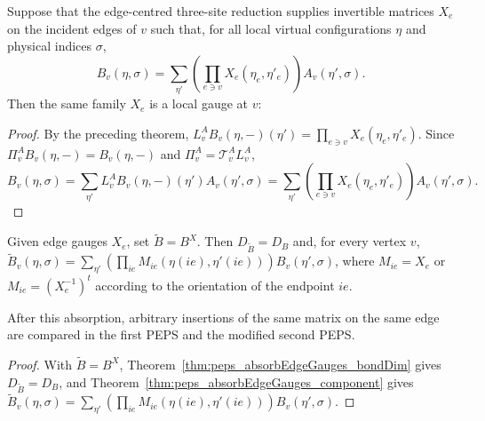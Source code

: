 \begin{theorem}%
    \label{thm:peps_localGauge_exists_of_blockedMiddleGaugeFormula}
    \leanok
    Suppose that the edge-centred three-site reduction supplies invertible
    matrices $X_e$ on the incident edges of $v$ such that, for all local virtual
    configurations $\eta$ and physical indices $\sigma$,
    \[
        B_v(\eta,\sigma)
        =
        \sum_{\eta'}
        \left(\prod_{e\ni v} X_e(\eta_e,\eta'_e)\right)A_v(\eta',\sigma).
    \]
    Then the same family $X_e$ is a local gauge at $v$:
    \begin{center}
        \TNPEPSBlockedMiddleLocalGaugeFormula
    \end{center}
\end{theorem}
\begin{proof}\leanok
    By the preceding theorem,
    $L^A_vB_v(\eta,-)(\eta')=\prod_{e\ni v}X_e(\eta_e,\eta'_e)$. Since
    $\Pi^A_vB_v(\eta,-)=B_v(\eta,-)$ and
    $\Pi^A_v=\mathcal T^A_vL^A_v$,
    \[
        B_v(\eta,\sigma)
        =
        \sum_{\eta'}L^A_vB_v(\eta,-)(\eta')A_v(\eta',\sigma)
        =
        \sum_{\eta'}
        \left(\prod_{e\ni v}X_e(\eta_e,\eta'_e)\right)A_v(\eta',\sigma).
    \]
\end{proof}

\begin{theorem}%
    \label{thm:peps_edge_gauge_absorption}
    \leanok
    Given edge gauges $X_e$, set $\widetilde B=B^X$. Then
    $D_{\widetilde B}=D_B$ and, for every vertex $v$,
    $\widetilde B_v(\eta,\sigma)=
        \sum_{\eta'}(\prod_{ie}M_{ie}(\eta(ie),\eta'(ie)))B_v(\eta',\sigma)$,
    where $M_{ie}=X_e$ or $M_{ie}=(X_e^{-1})^t$ according to the orientation of
    the endpoint $ie$.
    \begin{center}
        \TNPEPSEdgeGaugeAbsorption
    \end{center}
    After this absorption, arbitrary insertions of the same matrix on the same
    edge are compared in the first PEPS and the modified second PEPS.
\end{theorem}
\begin{proof}\leanok
    With $\widetilde B=B^X$, Theorem~\ref{thm:peps_absorbEdgeGauges_bondDim}
    gives $D_{\widetilde B}=D_B$, and
    Theorem~\ref{thm:peps_absorbEdgeGauges_component} gives
    $\widetilde B_v(\eta,\sigma)=
        \sum_{\eta'}(\prod_{ie}M_{ie}(\eta(ie),\eta'(ie)))B_v(\eta',\sigma)$.
\end{proof}

